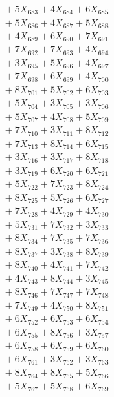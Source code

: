 \documentclass[a4paper,10pt]{article}
\begin{document}
{\begin{align}
&\;  + 5 X_{683} + 4 X_{684} + 6 X_{685} \\[0.3ex]
&\;  + 5 X_{686} + 4 X_{687} + 5 X_{688} \\[0.3ex]
&\;  + 4 X_{689} + 6 X_{690} + 7 X_{691} \\[0.3ex]
&\;  + 7 X_{692} + 7 X_{693} + 4 X_{694} \\[0.3ex]
&\;  + 3 X_{695} + 5 X_{696} + 4 X_{697} \\[0.3ex]
&\;  + 7 X_{698} + 6 X_{699} + 4 X_{700} \\[0.5ex]\allowbreak
&\;  + 8 X_{701} + 5 X_{702} + 6 X_{703} \\[0.3ex]
&\;  + 5 X_{704} + 3 X_{705} + 3 X_{706} \\[0.3ex]
&\;  + 5 X_{707} + 4 X_{708} + 5 X_{709} \\[0.3ex]
&\;  + 7 X_{710} + 3 X_{711} + 8 X_{712} \\[0.3ex]
&\;  + 7 X_{713} + 8 X_{714} + 6 X_{715} \\[0.3ex]
&\;  + 3 X_{716} + 3 X_{717} + 8 X_{718} \\[0.3ex]
&\;  + 3 X_{719} + 6 X_{720} + 6 X_{721} \\[0.3ex]
&\;  + 5 X_{722} + 7 X_{723} + 8 X_{724} \\[0.3ex]
&\;  + 8 X_{725} + 5 X_{726} + 6 X_{727} \\[0.3ex]
&\;  + 7 X_{728} + 4 X_{729} + 4 X_{730} \\[0.5ex]\allowbreak
&\;  + 5 X_{731} + 7 X_{732} + 3 X_{733} \\[0.3ex]
&\;  + 8 X_{734} + 7 X_{735} + 7 X_{736} \\[0.3ex]
&\;  + 8 X_{737} + 3 X_{738} + 8 X_{739} \\[0.3ex]
&\;  + 8 X_{740} + 4 X_{741} + 7 X_{742} \\[0.3ex]
&\;  + 4 X_{743} + 8 X_{744} + 3 X_{745} \\[0.3ex]
&\;  + 8 X_{746} + 7 X_{747} + 7 X_{748} \\[0.3ex]
&\;  + 7 X_{749} + 4 X_{750} + 8 X_{751} \\[0.3ex]
&\;  + 6 X_{752} + 6 X_{753} + 6 X_{754} \\[0.3ex]
&\;  + 6 X_{755} + 8 X_{756} + 3 X_{757} \\[0.3ex]
&\;  + 6 X_{758} + 6 X_{759} + 6 X_{760} \\[0.5ex]\allowbreak
&\;  + 6 X_{761} + 3 X_{762} + 3 X_{763} \\[0.3ex]
&\;  + 8 X_{764} + 8 X_{765} + 5 X_{766} \\[0.3ex]
&\;  + 5 X_{767} + 5 X_{768} + 6 X_{769} \\[0.3ex]

\end{align}}
\end{document}
